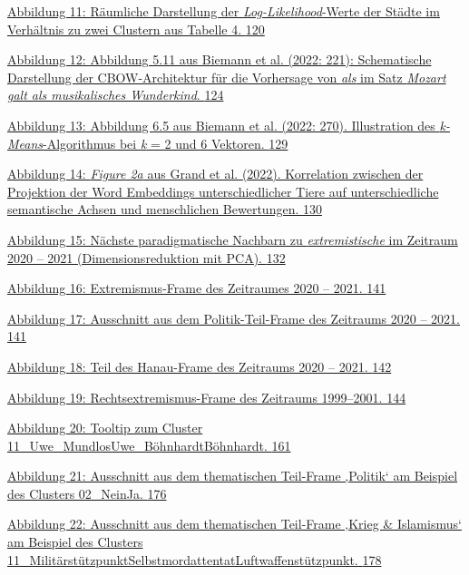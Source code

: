 \hyperref[_Ref162017013]{Abbildung 11: Räumliche Darstellung der \emph{Log-Likelihood}-Werte der Städte im Verhältnis zu zwei Clustern aus Tabelle 4. \hyperref[_Ref162017013]{120}}

\hyperref[_Ref162017046]{Abbildung 12: Abbildung 5.11 aus Biemann et al. (2022: 221): Schematische Darstellung der CBOW-Architektur für die Vorhersage von \emph{als} im Satz \emph{Mozart galt als musikalisches Wunderkind}. \hyperref[_Ref162017046]{124}}

\hyperref[_Ref162017066]{Abbildung 13: Abbildung 6.5 aus Biemann et al. (2022: 270). Illustration des \emph{k-Means}-Algorithmus bei \emph{k} = 2 und 6 Vektoren. \hyperref[_Ref162017066]{129}}

\hyperref[_Ref162016429]{Abbildung 14: \emph{Figure 2a} aus Grand et al. (2022). Korrelation zwischen der Projektion der Word Embeddings unterschiedlicher Tiere auf unterschiedliche semantische Achsen und menschlichen Bewertungen. \hyperref[_Ref162016429]{130}}

\hyperref[_Ref162016479]{Abbildung 15: Nächste paradigmatische Nachbarn zu \emph{extremistische} im Zeitraum 2020 -- 2021 (Dimensionsreduktion mit PCA). \hyperref[_Ref162016479]{132}}

\hyperref[_Ref162016499]{Abbildung 16: Extremismus-Frame des Zeitraumes 2020 -- 2021. \hyperref[_Ref162016499]{141}}

\hyperref[_Ref162016524]{Abbildung 17: Ausschnitt aus dem Politik-Teil-Frame des Zeitraums 2020 -- 2021. \hyperref[_Ref162016524]{141}}

\hyperref[_Ref162016542]{Abbildung 18: Teil des Hanau-Frame des Zeitraums 2020 -- 2021. \hyperref[_Ref162016542]{142}}

\hyperref[_Ref162453186]{Abbildung 19: Rechtsextremismus-Frame des Zeitraums 1999--2001. \hyperref[_Ref162453186]{144}}

\hyperref[_Ref162016812]{Abbildung 20: Tooltip zum Cluster 11\_Uwe\_Mundlos{\breakbar}Uwe\_Böhnhardt{\breakbar}Böhnhardt. \hyperref[_Ref162016812]{161}}

\hyperref[_Ref162439852]{Abbildung 21: Ausschnitt aus dem thematischen Teil-Frame ‚Politik` am Beispiel des Clusters 02\_Nein{\breakbar}Ja. \hyperref[_Ref162439852]{176}}

\hyperref[_Ref162439838]{Abbildung 22: Ausschnitt aus dem thematischen Teil-Frame ‚Krieg \& Islamismus` am Beispiel des Clusters 11\_Militärstützpunkt{\breakbar}Selbstmordattentat{\breakbar}Luftwaffenstützpunkt. \hyperref[_Ref162439838]{178}}

